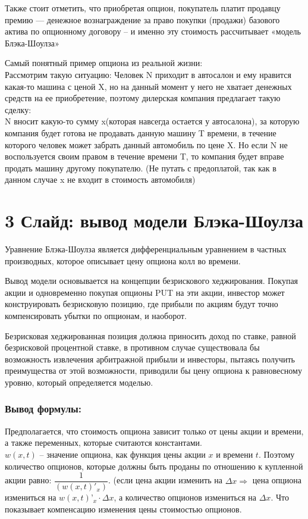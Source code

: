 \documentclass[a4paper]{article}
\begin{document}
Также стоит отметить, что приобретая опцион, покупатель платит продавцу премию — денежное вознаграждение за право покупки (продажи) базового актива по опционному договору -- и именно эту стоимость рассчитывает «модель Блэка-Шоулза»

Самый понятный пример опциона из реальной жизни:\\
Рассмотрим такую ситуацию:
Человек N приходит в автосалон и ему нравится какая-то машина с ценой X, но на данный момент у него не хватает денежных средств на ее приобретение, поэтому дилерская компания предлагает такую сделку:\\
N вносит какую-то сумму x(которая навсегда остается у автосалона), за которую компания будет готова не продавать данную машину T времени, в течение которого человек может забрать данный автомобиль по цене X.
Но если N не воспользуется своим правом в течение времени T, то компания будет вправе продать машину другому покупателю.
(Не путать с предоплатой, так как в данном случае x не входит в стоимость автомобиля)

\section*{3 Слайд: вывод модели Блэка-Шоулза}
Уравнение Блэка-Шоулза является дифференциальным уравнением в частных производных, которое описывает цену опциона колл во времени.

Вывод модели основывается на концепции безрискового хеджирования. Покупая акции и одновременно покупая опционы PUT на эти акции, инвестор может конструировать безрисковую позицию, где прибыли по акциям будут точно компенсировать убытки по опционам, и наоборот.

Безрисковая хеджированная позиция должна приносить доход по ставке, равной безрисковой процентной ставке, в противном случае существовала бы возможность извлечения арбитражной прибыли и инвесторы, пытаясь получить преимущества от этой возможности, приводили бы цену опциона к равновесному уровню, который определяется моделью.

\subsubsection*{Вывод формулы:}
Предполагается, что стоимость опциона зависит только от цены акции и времени, а также переменных, которые считаются константами. \\
$w(x, t)$ -- значение опциона, как функция цены акции $x$ и времени $t$. Поэтому количество опционов, которые должны быть проданы по отношению к купленной акции равно: $\dfrac{1}{(w(x,t)'_x)}$. (если цена акции изменить на $\Delta x \Rightarrow$  цена опциона измениться на $w(x,t)’_x \cdot \Delta x$, а количество опционов измениться на $\Delta x$. Что показывает компенсацию изменения цены стоимостью опционов.
\end{document}
